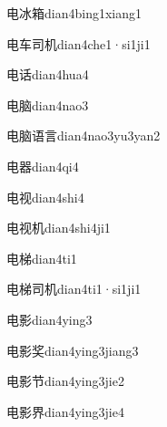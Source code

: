\begin{verbete}[5;6;15]{电冰箱}{dian4bing1xiang1}
\end{verbete}
\begin{verbete}[5;4;5;6]{电车司机}{dian4che1·si1ji1}
\end{verbete}
\begin{verbete}[5;8]{电话}{dian4hua4}
\end{verbete}
\begin{verbete}[5;10]{电脑}{dian4nao3}
\end{verbete}
\begin{verbete}[5;10;9;7]{电脑语言}{dian4nao3yu3yan2}
\end{verbete}
\begin{verbete}[5;16]{电器}{dian4qi4}
\end{verbete}
\begin{verbete}[5;8]{电视}{dian4shi4}
\end{verbete}
\begin{verbete}[5;8;6]{电视机}{dian4shi4ji1}
\end{verbete}
\begin{verbete}[5;11]{电梯}{dian4ti1}
\end{verbete}
\begin{verbete}[5;11;5;6]{电梯司机}{dian4ti1·si1ji1}
\end{verbete}
\begin{verbete}[5;15]{电影}{dian4ying3}
\end{verbete}
\begin{verbete}[5;15;9]{电影奖}{dian4ying3jiang3}
\end{verbete}
\begin{verbete}[5;15;5]{电影节}{dian4ying3jie2}
\end{verbete}
\begin{verbete}[5;15;9]{电影界}{dian4ying3jie4}
\end{verbete}
